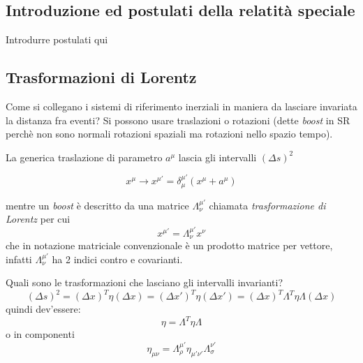 \documentclass[twoside]{article}
\begin{document}
\subsection{Introduzione ed postulati della relatità speciale}
Introdurre postulati qui
\subsection{Trasformazioni di Lorentz}
Come si collegano i sistemi di riferimento inerziali in maniera da lasciare invariata la distanza fra eventi?
Si possono usare traslazioni o rotazioni (dette \emph{boost} in SR perchè non sono normali rotazioni spaziali ma rotazioni nello spazio tempo).

La generica traslazione di parametro $a^\mu$ lascia gli intervalli $(\Delta s)^2$

$$x^\mu \rightarrow x^{\mu'} = \delta^{\mu'}_\mu (x^\mu + a^\mu)$$

mentre un \emph{boost} è descritto da una matrice $\Lambda^{\mu'}_{\nu}$ chiamata \emph{trasformazione di Lorentz} per cui
$$
x^{\mu'} = \Lambda^{\mu'}_{\nu} x^\nu
$$
che in notazione matriciale convenzionale è un prodotto matrice per vettore, infatti $\Lambda^{\mu'}_\nu$ ha 2 indici contro e covarianti.

Quali sono le trasformazioni che lasciano gli intervalli invarianti?
\begin{equation}
	(\Delta s)^2 = (\Delta x)^T \eta (\Delta x) = (\Delta x')^T \eta (\Delta x') = (\Delta x)^T \Lambda^T \eta \Lambda (\Delta x)
\end{equation}
quindi dev'essere:
$$
\eta = \Lambda^T \eta \Lambda
$$
o in componenti 
\begin{equation}
	\eta_{\mu \nu} = \Lambda^{\mu'}_{\rho} \eta_{\mu' \nu'} \Lambda^{\nu'}_{\sigma}
\end{equation}
\end{document}
